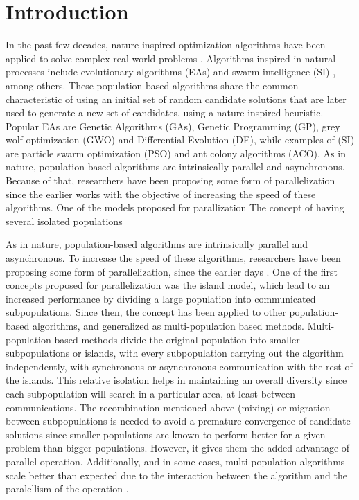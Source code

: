 \documentclass[runningheads]{llncs}
\begin{document}
\section{Introduction}

In the past few decades, nature-inspired optimization algorithms have been
applied to solve complex real-world problems \cite{yang2014nature}. Algorithms
inspired in natural processes  include evolutionary algorithms (EAs)
\cite{back1996evolutionary} and swarm intelligence (SI) \cite{kennedy2006swarm}, among others.
These population-based algorithms share the common characteristic of using an initial set of
random candidate solutions that are later used to generate a new set of
candidates, using a nature-inspired heuristic. Popular EAs are Genetic Algorithms (GAs),
Genetic Programming (GP), grey wolf optimization (GWO) and Differential Evolution (DE), 
while examples of (SI) are particle swarm optimization (PSO) and
ant colony algorithms (ACO). 
As in nature, population-based algorithms are intrinsically parallel and
asynchronous. Because of that, researchers have been proposing some form of
parallelization since the earlier works \cite{muhlenbein1988evolution} with the
objective of increasing the speed of these algorithms. One of the models
proposed for parallization The concept of having several isolated populations 


As in nature, population-based algorithms are intrinsically parallel and
asynchronous. To increase the speed of these algorithms, researchers have been
proposing some form of parallelization, since the earlier days
\cite{muhlenbein1988evolution}. 
One of the first concepts proposed for
parallelization was the island model, which lead to an increased performance
\cite{gorges1990explicit,grosso1985computer} by dividing a large population
into communicated subpopulations.
Since then, the concept has been applied to
other population-based algorithms, and generalized as multi-population based
methods. Multi-population based methods divide the original population into
smaller subpopulations or islands, with every subpopulation carrying out the
algorithm independently, with synchronous or asynchronous communication with the
rest of the islands. This relative isolation helps in maintaining an overall
diversity since each subpopulation will search in a particular area, at least
between communications. The recombination mentioned above (mixing) or migration
between subpopulations is needed to avoid a premature convergence of candidate
solutions since smaller populations are known to perform better for a given
problem than bigger populations. However, it gives them the added advantage of
parallel operation. Additionally, and in some cases, multi-population algorithms
scale better than expected due to the interaction between the algorithm and the
paralellism of the operation \cite{ALBA20027}.
\end{document}
